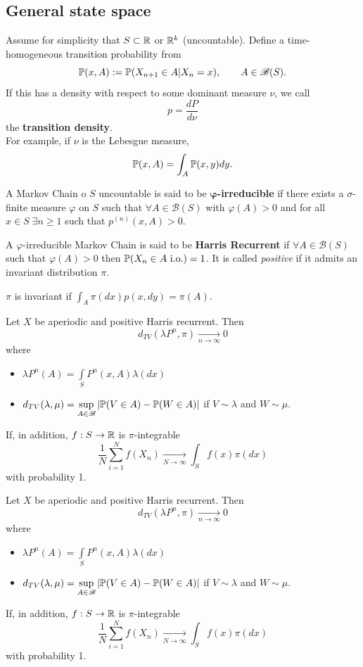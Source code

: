 \documentclass{article}
\begin{document}
\subsection{General state space}
Assume for simplicity that $S\subset\mathbb{R}$ or $\mathbb{R}^k$ (uncountable). Define a time-homogeneous transition probability from 
\[\mathbb{P}(x,A):=\mathbb{P}(X_{n+1}\in A|X_n=x),\qquad A\in\mathscr{B}(S).\]
If this has a density with respect to some dominant measure $\nu$, we call
\[p=\frac{dP}{d\nu}\]
the \textbf{transition density}.\\
For example, if $\nu$ is the Lebesgue measure,
\[\mathbb{P}(x,A)=\int_A \mathbb{P}(x,y)dy.\]
\begin{definition} 
    A Markov Chain o $S$ uncountable is said to be $\mathbf{\varphi}$\textbf{-irreducible} if there exists a $\sigma$-finite measure $\varphi$ on $S$ such that $\forall A\in\mathscr{B}(S)$ with $\varphi(A)>0$ and for all $x\in S\;\exists n\geqslant1$ such that $p^{(n)}(x,A)>0$.
\end{definition}
\begin{definition}
    A $\varphi$-irreducible Markov Chain is said to be \textbf{Harris Recurrent} if $\forall A \in \mathscr{B}(S)$ such that $\varphi(A)>0$ then $\mathbb{P}(X_n\in A \text{ i.o.})=1$. It is called \textit{positive} if it admits an invariant distribution $\pi$.
\end{definition}
$\pi$ is invariant if $\int_A\pi(dx)p(x,dy)=\pi(A)$.
\begin{theorem}
    Let $X$ be aperiodic and positive Harris recurrent. Then
        \[d_{TV}(\lambda P^n,\pi)\xrightarrow[n\to\infty]{}0
        \]
        where
        \begin{itemize}
            \item $\displaystyle\lambda P^n(A)=\int\limits_SP^n(x,A)\lambda(dx)$
            \item $\displaystyle d_{TV}(\lambda,\mu)=\sup\limits_{A\in\mathscr{B}}|\mathbb{P}(V\in A)-\mathbb{P}(W\in A)|$ if $V\sim\lambda$ and $W\sim\mu$.
        \end{itemize}
        If, in addition, $f:S\to\mathbb{R}$ is $\pi$-integrable
        \[
        \frac{1}{N}\sum_{i=1}^Nf(X_n)\xrightarrow[N\to\infty]{}\int_Sf(x)\pi(dx)
        \]
        with probability 1.
\end{theorem}
\begin{definition}
    Let $X$ be aperiodic and positive Harris recurrent. Then
        \[d_{TV}(\lambda P^n,\pi)\xrightarrow[n\to\infty]{}0
        \]
        where
        \begin{itemize}
            \item $\displaystyle\lambda P^n(A)=\int\limits_SP^n(x,A)\lambda(dx)$
            \item $\displaystyle d_{TV}(\lambda,\mu)=\sup\limits_{A\in\mathscr{B}}|\mathbb{P}(V\in A)-\mathbb{P}(W\in A)|$ if $V\sim\lambda$ and $W\sim\mu$.
        \end{itemize}
        If, in addition, $f:S\to\mathbb{R}$ is $\pi$-integrable
        \[
        \frac{1}{N}\sum_{i=1}^Nf(X_n)\xrightarrow[N\to\infty]{}\int_Sf(x)\pi(dx)
        \]
        with probability 1.
\end{definition}
\end{document}
